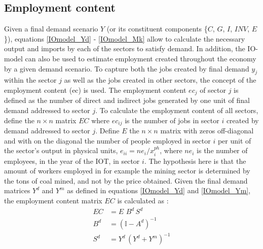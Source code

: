 \documentclass[12pt,english]{article}
\newcommand{\mli}[1]{\mathit{#1}}
\begin{document}
\subsection{Employment content}\label{ec}


Given a final demand scenario $Y$ (or its constituent components \{$C$, $G$, $I$, $\mli{INV}$, $E$\}), equations \ref{IOmodel_Yd} - \ref{IOmodel_Mk} allow to calculate the necessary output and imports by each of the sectors to satisfy demand. In addition, the IO-model can also be used to estimate employment created throughout the economy by a given demand scenario. To capture both the jobs created by final demand $y_j$ %
within the sector $j$ as well as the jobs created in other sectors, the concept of the employment content (ec) is used. The employment content $ec_j$ of sector $j$ is defined as the number of direct and indirect jobs generated by one unit of final demand addressed to %
sector $j$. To calculate the employment content of all sectors, define the $n \times n$ matrix $EC$ where $ec_{ij}$  is the number of jobs in sector $i$ created by demand addressed to sector $j$. Define $E$ the $n\times n$ matrix with zeros off-diagonal and with on the diagonal the number of people employed in sector $i$ per unit of the sector's output in physical units, $e_{ii}=ne_i/x^{ph}_i$, where $ne_i$ is the number of employees, in the year of the IOT, in sector $i$. The hypothesis here is that the amount of workers employed in for example the mining sector is determined by the tons of coal mined, and not by the price obtained. Given the final demand matrices $Y^d$ and $Y^m$ as defined in equations \ref{IOmodel_Yd} and \ref{IOmodel_Ym}, the employment content matrix $EC$ is calculated as :
\begin{align}
EC	 &= E\,  \, B^d \, S^d \label{EC} \\ 
B^d &=  (\mathbb{I}-A^d)^{-1} \\
S^d	 &=  Y^d \, (Y^d+Y^m)^{-1}  
\end{align}
\end{document}
